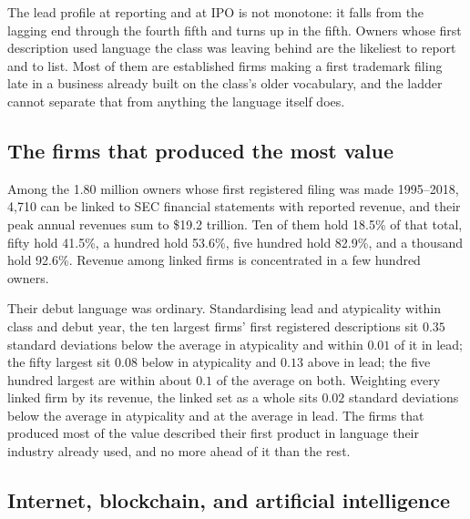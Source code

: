The lead profile at reporting and at IPO is not monotone: it falls from the
lagging end through the fourth fifth and turns up in the fifth. Owners
whose first description used language the class was leaving behind are the
likeliest to report and to list. Most of them are established firms making
a first trademark filing late in a business already built on the class's
older vocabulary, and the ladder cannot separate that from anything the
language itself does.


\subsection{The firms that produced the most value}\label{sec:value}

Among the 1.80 million owners whose first registered filing was made
1995--2018, 4{,}710 can be linked to SEC financial statements with
reported revenue, and their peak annual revenues sum to \$19.2 trillion.
Ten of them hold 18.5\% of that total, fifty hold 41.5\%, a hundred hold
53.6\%, five hundred hold 82.9\%, and a thousand hold 92.6\%. Revenue among linked firms is concentrated in a few hundred owners.

Their debut language was ordinary. Standardising lead and atypicality
within class and debut year, the ten largest firms' first registered
descriptions sit $0.35$ standard deviations below the average in
atypicality and within $0.01$ of it in lead; the fifty largest sit $0.08$
below in atypicality and $0.13$ above in lead; the five hundred largest are
within about $0.1$ of the average on both. Weighting every linked firm by its
revenue, the linked set as a whole sits $0.02$ standard deviations below
the average in atypicality and at the average in lead. The firms that
produced most of the value described their first product in language their
industry already used, and no more ahead of it than the rest.


\subsection{Internet, blockchain, and artificial intelligence}\label{sec:curated}

